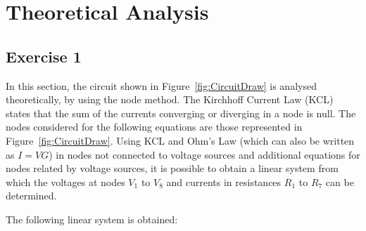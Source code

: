 \section{Theoretical Analysis}
\label{sec:analysis}

\subsection{Exercise 1}

In this section, the circuit shown in Figure~\ref{fig:CircuitDraw} is analysed theoretically, by using the node method. The Kirchhoff Current Law (KCL) states that the sum of the currents converging or diverging in a node is null. The nodes considered for the following equations are those represented in Figure~\ref{fig:CircuitDraw}. Using KCL and Ohm's Law (which can also be written as $I=VG$) in nodes not connected to voltage sources and additional equations for nodes related by voltage sources, it is possible to obtain a linear system from which the voltages at nodes $V_1$ to $V_8$ and currents in resistances $R_1$ to $R_7$ can be determined.

\par
\vspace{1mm}

The following linear system is obtained:

